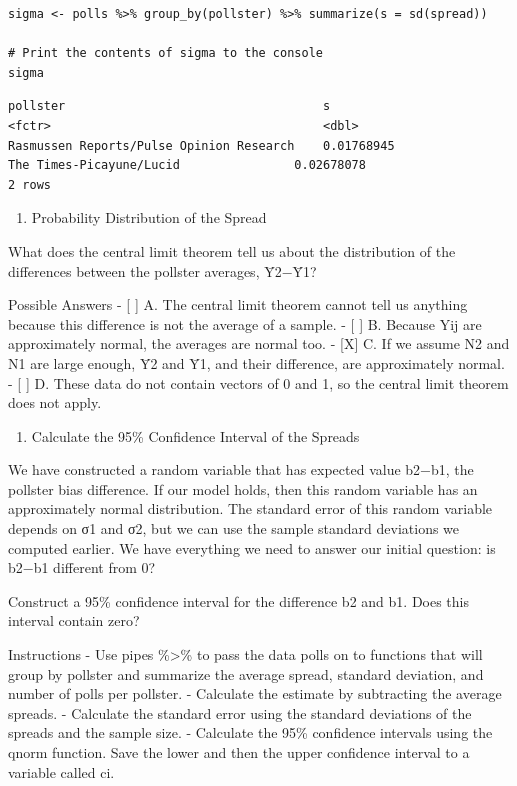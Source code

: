 \documentclass[
]{article}
\providecommand{\tightlist}{%
  \setlength{\itemsep}{0pt}\setlength{\parskip}{0pt}}
\begin{document}
\begin{verbatim}
sigma <- polls %>% group_by(pollster) %>% summarize(s = sd(spread))

# Print the contents of sigma to the console
sigma
\end{verbatim}

\begin{verbatim}
pollster                                    s
<fctr>                                      <dbl>
Rasmussen Reports/Pulse Opinion Research    0.01768945
The Times-Picayune/Lucid                0.02678078
2 rows
\end{verbatim}

\begin{enumerate}
\def\labelenumi{\arabic{enumi}.}
\setcounter{enumi}{13}
\tightlist
\item
  Probability Distribution of the Spread
\end{enumerate}

What does the central limit theorem tell us about the distribution of
the differences between the pollster averages, Ȳ2−Ȳ1?

Possible Answers - {[} {]} A. The central limit theorem cannot tell us
anything because this difference is not the average of a sample. - {[}
{]} B. Because Yij are approximately normal, the averages are normal
too. - {[}X{]} C. If we assume N2 and N1 are large enough, Ȳ2 and Ȳ1,
and their difference, are approximately normal. - {[} {]} D. These data
do not contain vectors of 0 and 1, so the central limit theorem does not
apply.

\begin{enumerate}
\def\labelenumi{\arabic{enumi}.}
\setcounter{enumi}{14}
\tightlist
\item
  Calculate the 95\% Confidence Interval of the Spreads
\end{enumerate}

We have constructed a random variable that has expected value b2−b1, the
pollster bias difference. If our model holds, then this random variable
has an approximately normal distribution. The standard error of this
random variable depends on σ1 and σ2, but we can use the sample standard
deviations we computed earlier. We have everything we need to answer our
initial question: is b2−b1 different from 0?

Construct a 95\% confidence interval for the difference b2 and b1. Does
this interval contain zero?

Instructions - Use pipes \%\textgreater\% to pass the data polls on to
functions that will group by pollster and summarize the average spread,
standard deviation, and number of polls per pollster. - Calculate the
estimate by subtracting the average spreads. - Calculate the standard
error using the standard deviations of the spreads and the sample size.
- Calculate the 95\% confidence intervals using the qnorm function. Save
the lower and then the upper confidence interval to a variable called
ci.
\end{document}
